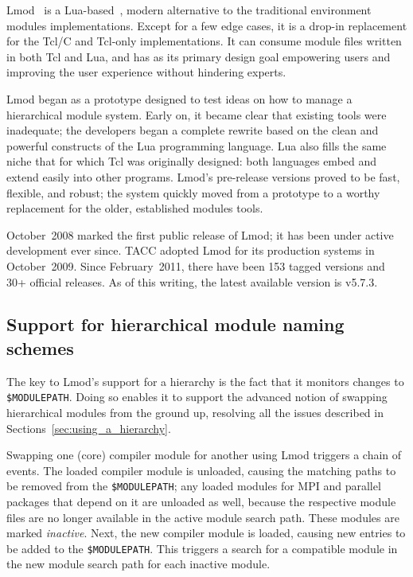 Lmod~\cite{laytonLmod,taccSecretSauce,taccLmod} is a Lua-based~\cite{LuaBook}, modern alternative to
the traditional environment modules implementations. Except for a few edge cases, it is a drop-in replacement for the Tcl/C
and Tcl-only implementations. It can consume module files written in both Tcl and
Lua, and has as its primary design goal empowering users
and improving the user experience without hindering experts.

Lmod began as a prototype designed to test
ideas on how to manage a hierarchical module system.  Early on, it became clear that existing tools were inadequate; 
the developers began a complete rewrite based on the clean
and powerful constructs of the Lua programming language.
Lua also fills the same niche that for which Tcl was
originally designed: both languages embed and extend easily into
other programs.  Lmod's pre-release versions proved to be
fast, flexible, and robust; the system quickly moved from
a prototype to a worthy replacement for the older, established modules tools.

October~2008 marked the first public release of Lmod; it has
been under active development
ever since. TACC adopted Lmod for its production systems in October~2009. Since February~2011, there have been 153 tagged versions and
30+ official releases. As of this writing, the latest available version is v5.7.3.

\subsection{Support for hierarchical module naming schemes}

The key to Lmod's support for a hierarchy is the fact that it monitors changes to
\texttt{\small \$MODULEPATH}. Doing so enables it to support the advanced notion of
swapping hierarchical modules from the ground up, resolving all the issues described in
Sections~\ref{sec:using_a_hierarchy}.

Swapping one (core) compiler module for another using Lmod triggers
a chain of events.  The loaded compiler module is unloaded, 
causing the matching paths to be removed from the \texttt{\small \$MODULEPATH}; 
 any loaded modules for MPI and parallel packages that depend on it
are unloaded as well, because the respective module files are no longer available
in the active module search path. These modules are marked \emph{inactive}.
Next, the new compiler module is loaded, causing new entries
to be added to the \texttt{\small \$MODULEPATH}. This triggers a search
for a compatible module in the new module search path for each inactive module.

